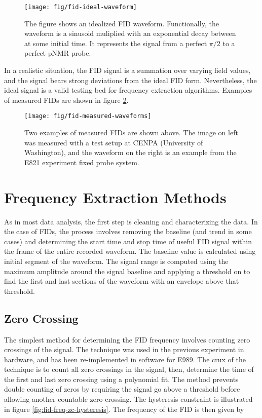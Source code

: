 \begin{figure}
\label{fig:fid-ideal-waveform}
\centering
\texttt{[image: fig/fid-ideal-waveform]}
\caption{The figure shows an idealized FID waveform. Functionally, the waveform is a sinusoid muliplied with an exponential decay between at some initial time.  It represents the signal from a perfect $\pi/2$ to a perfect pNMR probe.}
\end{figure}

In a realistic situation, the FID signal is a summation over varying field values, and the signal bears strong deviations from the ideal FID form.  Nevertheless, the ideal signal is a valid testing bed for frequency extraction algorithms.  Examples of measured FIDs are shown in figure \ref{fig:fid-measured-waveforms}.

\begin{figure}
\label{fig:fid-measured-waveforms}
\texttt{[image: fig/fid-measured-waveforms]}
\caption{Two examples of measured FIDs are shown above. The image on left was measured with a test setup at CENPA (University of Washington), and the waveform on the right is an example from the E821 experiment fixed probe system.}
\end{figure}

\section{Frequency Extraction Methods}

As in most data analysis, the first step is cleaning and characterizing the data.  In the case of FIDs, the process involves removing the baseline (and trend in some cases) and determining the start time and stop time of useful FID signal within the frame of the entire recorded waveform.  The baseline value is calculated using initial segment of the waveform.  The signal range is computed using the maximum amplitude around the signal baseline and applying a threshold on to find the first and last sections of the waveform with an envelope above that threshold.

\subsection{Zero Crossing}
The simplest method for determining the FID frequency involves counting zero crossings of the signal.  The technique was used in the previous \mugmtwo experiment in hardware, and has been re-implemented in software for E989.  The crux of the technique is to count all zero crossings in the signal, then, determine the time of the first and last zero crossing using a polynomial fit.  The method prevents double counting of zeros by requiring the signal go above a threshold before allowing another countable zero crossing.  The hysteresis constraint is illustrated in figure \ref{fig:fid-freq-zc-hysteresis}.  The frequency of the FID is then given by

